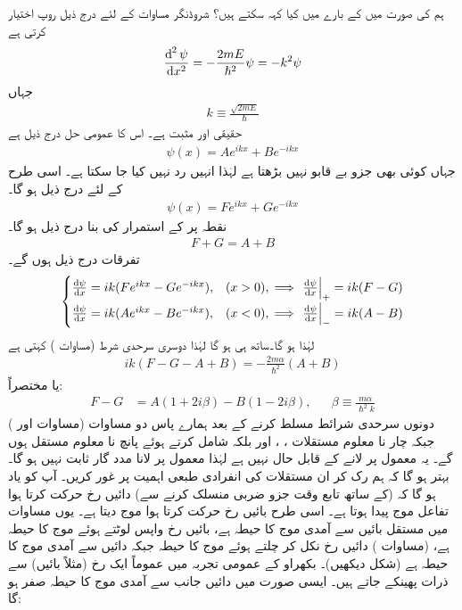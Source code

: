 ہم   کی صورت میں  کے بارے میں کیا کہہ سکتے ہیں؟ شروڈنگر مساوات  کے لئے  درج ذیل روپ اختیار کرتی ہے
\begin{align*}
\frac{\dif^{\,2}\psi}{\dif x^2}=-\frac{2mE}{\hslash^2}\psi=-k^2\psi
\end{align*}
 جہاں
\begin{align*}
k\equiv\frac{\sqrt{2mE}}{\hslash}
\end{align*}
 حقیقی اور مثبت ہے۔ اس کا عمومی حل  درج ذیل ہے
\begin{align}\label{مساوات_شروڈنگر_بایاں_حل_ڈیلٹا}
\psi(x)=Ae^{ikx}+Be^{-ikx}
\end{align}
جہاں کوئی بھی جزو بے قابو نہیں بڑھتا ہے لہٰذا انہیں رد نہیں کیا جا سکتا ہے۔ اسی طرح  کے لئے درج ذیل ہو گا۔
\begin{align}\label{مساوات_شروڈنگر_دایاں_حل_ڈیلٹا}
\psi(x)=Fe^{ikx}+Ge^{-ikx}
\end{align}
نقطہ  پر  کے استمرار کی بنا درج ذیل ہو گا۔
\begin{align}\label{مساوات_شروڈنگر_شرط_اول}
F+G=A+B
\end{align}
تفرقات درج ذیل ہوں گے۔
\begin{align*}
\begin{cases}
\frac{\dif\psi}{\dif x}=ik(Fe^{ikx}-Ge^{-ikx}),& (x>0),\implies \left.\frac{\dif\psi}{\dif x}\right|_{+}=ik(F-G)\\[5pt]
\frac{\dif\psi}{\dif x}=ik(Ae^{ikx}-Be^{-ikx}),& (x<0),\implies \left.\frac{\dif\psi}{\dif x}\right|_{-}=ik(A-B)
\end{cases}
\end{align*}
لہٰذا  ہو گا۔ساتھ ہی  ہو گا لہٰذا دوسری سرحدی شرط (مساوات ) کہتی ہے
\begin{align}
ik(F-G-A+B)=-\frac{2m\alpha}{\hslash^2}(A+B)
\end{align}
یا مختصراً:
\begin{align}\label{مساوات_شروڈنگر_شرط_دوم}
F-G&=A(1+2i\beta)-B(1-2i\beta),&&\beta\equiv\frac{m\alpha}{\hslash^2 k}
\end{align}
دونوں سرحدی شرائط مسلط کرنے کے بعد ہمارے پاس دو مساوات (مساوات  اور ) جبکہ چار نا معلوم مستقلات ، ،  اور  بلکہ  شامل کرتے ہوئے پانچ نا معلوم مستقل ہوں گے۔ یہ معمول پر لانے کے قابل حال نہیں ہے لہٰذا معمول پر لانا مدد گار ثابت نہیں ہو گا۔ بہتر ہو گا کہ ہم رک کر ان  مستقلات کی انفرادی طبعی اہمیت پر غور کریں۔  آپ کو یاد ہو گا کہ  (کے ساتھ  تابع وقت جزو ضربی  منسلک کرنے سے) دائیں رخ حرکت کرتا ہوا تفاعل موج پیدا ہوتا ہے۔ اسی طرح  بائیں رخ حرکت کرتا ہوا موج دیتا ہے۔ یوں مساوات  میں مستقل  بائیں سے آمدی موج کا حیطہ ہے،  بائیں رخ واپس لوٹتے ہوئے موج کا حیطہ ہے،  (مساوات ) دائیں رخ نکل کر چلتے ہوئے موج کا حیطہ  جبکہ  دائیں سے آمدی موج کا حیطہ ہے (شکل  دیکھیں)۔ بکھراو کے عمومی تجربہ میں عموماً ایک رخ (مثلاً بائیں) سے ذرات پھینکے جاتے ہیں۔ ایسی صورت میں دائیں جانب سے آمدی موج کا حیطہ صفر ہو گا:
